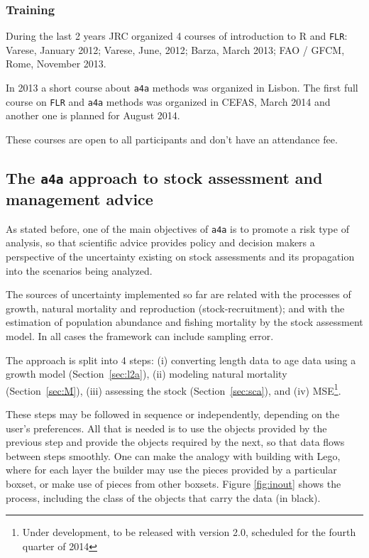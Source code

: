 \documentclass[a4paper,english,10pt]{article}\usepackage[]{graphicx}\usepackage[]{color}
\newcommand{\initiative}[1]{{\texttt{#1}}}
\newcommand{\pkg}[1]{{\texttt{#1}}}
\begin{document}
\subsubsection{Training}

During the last 2 years JRC organized 4 courses of introduction to R and \pkg{FLR}: Varese, January 2012; Varese, June, 2012; Barza, March 2013; FAO / GFCM, Rome, November 2013.

In 2013 a short course about \initiative{a4a} methods was organized in Lisbon. The first full course on \pkg{FLR} and \initiative{a4a} methods was organized in CEFAS, March 2014 and another one is planned for August 2014.

These courses are open to all participants and don't have an attendance fee.

\subsection{The \initiative{a4a} approach to stock assessment and management advice}

As stated before, one of the main objectives of \initiative{a4a} is to promote a risk type of analysis, so that scientific advice provides policy and decision makers a perspective of the uncertainty existing on stock assessments and its propagation into the scenarios being analyzed.

The sources of uncertainty implemented so far are related with the processes of growth, natural mortality and reproduction (stock-recruitment); and with the estimation of population abundance and fishing mortality by the stock assessment model. In all cases the framework can include sampling error.

The approach is split into 4 steps: (i) converting length data to age data using a growth model (Section~\ref{sec:l2a}), (ii) modeling natural mortality (Section~\ref{sec:M}), (iii) assessing the stock (Section~\ref{sec:sca}), and (iv) MSE\footnote{Under development, to be released with version 2.0, scheduled for the fourth quarter of 2014}.

These steps may be followed in sequence or independently, depending on the user's preferences. All that is needed is to use the objects provided by the previous step and provide the objects required by the next, so that data flows between steps smoothly. One can make the analogy with building with Lego, where for each layer the builder may use the pieces provided by a particular boxset, or make use of pieces from other boxsets. Figure \ref{fig:inout} shows the process, including the class of the objects that carry the data (in black).
\end{document}
